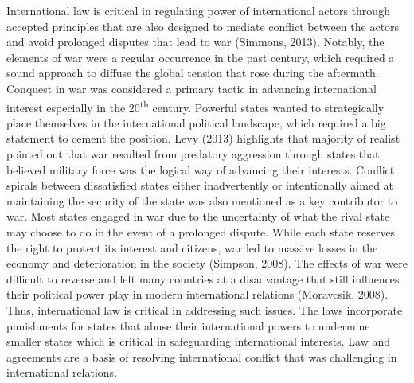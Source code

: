 \documentclass[11pt]{article}
\begin{document}
International law is critical in regulating power of international actors through accepted principles that are also designed to mediate conflict between the actors and avoid prolonged disputes that lead to war (Simmons, 2013). Notably, the elements of war were a regular occurrence in the past century, which required a sound approach to diffuse the global tension that rose during the aftermath. Conquest in war was considered a primary tactic in advancing international interest especially in the 20\textsuperscript{th} century. Powerful states wanted to strategically place themselves in the international political landscape, which required a big statement to cement the position. Levy (2013) highlights that majority of realist pointed out that war resulted from predatory aggression through states that believed military force was the logical way of advancing their interests. Conflict spirals between dissatisfied states either inadvertently or intentionally aimed at maintaining the security of the state was also mentioned as a key contributor to war. Most states engaged in war due to the uncertainty of what the rival state may choose to do in the event of a prolonged dispute. While each state reserves the right to protect its interest and citizens, war led to massive losses in the economy and deterioration in the society (Simpson, 2008). The effects of war were difficult to reverse and left many countries at a disadvantage that still influences their political power play in modern international relations (Moravcsik, 2008). Thus, international law is critical in addressing such issues. The laws incorporate punishments for states that abuse their international powers to undermine smaller states which is critical in safeguarding international interests. Law and agreements are a basis of resolving international conflict that was challenging in international relations.
\end{document}
